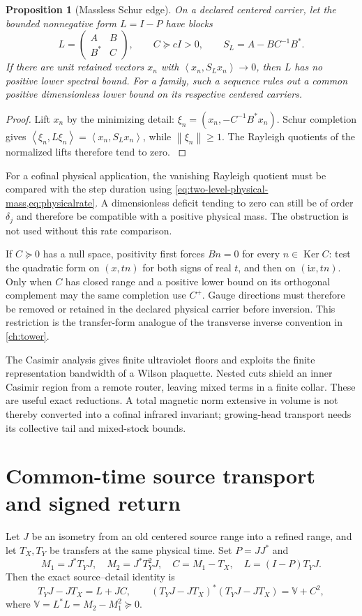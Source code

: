 \documentclass[11pt,oneside,openany]{book}
\newtheorem{proposition}[proposition]{Proposition}
\theoremstyle{definition}
\theoremstyle{remark}
\newcommand{\ii}{\mathrm i}
\newcommand{\Ker}{\operatorname{Ker}}
\newcommand{\norm}[1]{\left\lVert#1\right\rVert}
\newcommand{\ip}[2]{\left\langle#1,#2\right\rangle}
\newcommand{\src}[2]{\cite[#2]{#1}}
\begin{document}
\begin{proposition}[Massless Schur edge]
\label{prop:massless-Schur-edge}
On a declared centered carrier, let the bounded nonnegative form
$L=I-P$ have blocks
\[
L=\begin{pmatrix}A&B\\B^*&C\end{pmatrix},\qquad C\succeq cI>0,
\qquad S_L=A-BC^{-1}B^*.
\]
If there are unit retained vectors $x_n$ with
$\ip{x_n}{S_Lx_n}\to0$, then $L$ has no positive lower spectral bound.
For a family, such a sequence rules out a common positive
dimensionless lower bound on its respective centered carriers.
\end{proposition}
\begin{proof}
Lift $x_n$ by the minimizing detail:
$\xi_n=(x_n,-C^{-1}B^*x_n)$. Schur completion gives
$\ip{\xi_n}{L\xi_n}=\ip{x_n}{S_Lx_n}$, while
$\norm{\xi_n}\ge1$. The Rayleigh quotients of the normalized lifts
therefore tend to zero. \src{F6}{V57}
\end{proof}

For a cofinal physical application, the vanishing Rayleigh quotient
must be compared with the step duration using
\cref{eq:two-level-physical-mass,eq:physicalrate}. A dimensionless
deficit tending to zero can still be of order $\delta_j$ and therefore
be compatible with a positive physical mass. The obstruction is not
used without this rate comparison.

If $C\succeq0$ has a null space, positivity first forces
$B n=0$ for every $n\in\Ker C$: test the quadratic form on
$(x,tn)$ for both signs of real $t$, and then on $(\ii x,tn)$.
Only when $C$ has closed range and a positive lower bound on its
orthogonal complement may the same completion use $C^+$.
Gauge directions must therefore be removed or retained in the declared
physical carrier before inversion. This restriction is the transfer-form
analogue of the transverse inverse convention in \cref{ch:tower}.

The Casimir analysis gives finite ultraviolet floors and exploits the finite representation bandwidth of a Wilson plaquette. Nested cuts shield an inner Casimir region from a remote router, leaving mixed terms in a finite collar. These are useful exact reductions. A total magnetic norm extensive in volume is not thereby converted into a cofinal infrared invariant; growing-head transport needs its collective tail and mixed-stock bounds. \src{F1}{V3--V6}

\section{Common-time source transport and signed return}
Let $J$ be an isometry from an old centered source range into a refined range, and let $T_X,T_Y$ be transfers at the same physical time. Set $P=JJ^*$ and
\[
M_1=J^*T_YJ,\quad M_2=J^*T_Y^2J,\quad
C=M_1-T_X,\quad L=(I-P)T_YJ.
\]
Then the exact source--detail identity is
\begin{equation}\label{eq:transport-defect}
T_YJ-JT_X=L+JC,\qquad
(T_YJ-JT_X)^*(T_YJ-JT_X)=\mathbb V+C^2,
\end{equation}
where $\mathbb V=L^*L=M_2-M_1^2\succeq0$.
\end{document}
